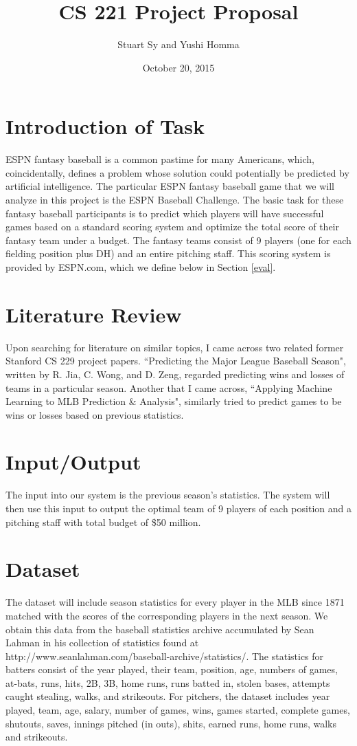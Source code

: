 \documentclass[11pt]{amsart}
\begin{document}
\title{CS 221 Project Proposal}
\author{Stuart Sy and Yushi Homma}
\date{October 20, 2015}
\maketitle
\section{Introduction of Task}
\label{def}
ESPN fantasy baseball is a common pastime for many Americans, which, coincidentally, defines a problem whose solution could potentially be predicted by artificial intelligence. The particular ESPN fantasy baseball game that we will analyze in this project is the ESPN Baseball Challenge. The basic task for these fantasy baseball participants is to predict which players will have successful games based on a standard scoring system and optimize the total score of their fantasy team under a budget. The fantasy teams consist of 9 players (one for each fielding position plus DH) and an entire pitching staff. This scoring system is provided by ESPN.com, which we define below in Section \ref{eval}.

\section{Literature Review}
Upon searching for literature on similar topics, I came across two related former Stanford CS 229 project papers. ``Predicting the Major League Baseball Season", written by R. Jia, C. Wong, and D. Zeng, regarded predicting wins and losses of teams in a particular season. Another that I came across, ``Applying Machine Learning to MLB Prediction \& Analysis", similarly tried to predict games to be wins or losses based on previous statistics. 

\section{Input/Output}
\label{io}
The input into our system is the previous season's statistics. The system will then use this input to output the optimal team of 9 players of each position and a pitching staff with total budget of \$50 million.

\section{Dataset}
The dataset will include season statistics for every player in the MLB since 1871 matched with the scores of the corresponding players in the next season. We obtain this data from the baseball statistics archive accumulated by Sean Lahman in his collection of statistics found at http://www.seanlahman.com/baseball-archive/statistics/. The statistics for batters consist of the year played, their team, position, age, numbers of games, at-bats, runs, hits, 2B, 3B, home runs, runs batted in, stolen bases, attempts caught stealing, walks, and strikeouts. For pitchers, the dataset includes year played, team, age, salary, number of games, wins, games started, complete games, shutouts, saves, innings pitched (in outs), shits, earned runs, home runs, walks and strikeouts.
\end{document}
